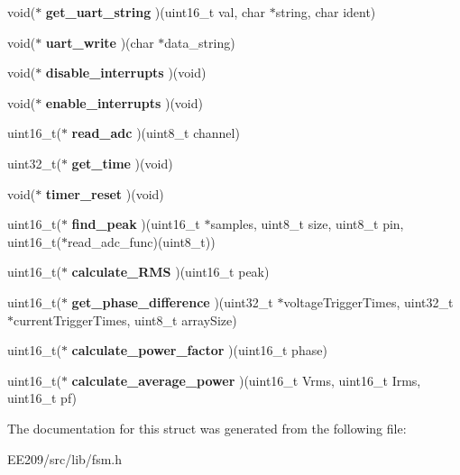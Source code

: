 \begin{DoxyCompactItemize}
void($\ast$ {\bfseries get\+\_\+uart\+\_\+string} )(uint16\+\_\+t val, char $\ast$string, char ident)
\item 
\mbox{\label{structfunctionPointers_aea87a41b93da211db78258d03c4a9333}} 
void($\ast$ {\bfseries uart\+\_\+write} )(char $\ast$data\+\_\+string)
\item 
\mbox{\label{structfunctionPointers_a873d8ee1c634c5eb394a2c218dd1a06f}} 
void($\ast$ {\bfseries disable\+\_\+interrupts} )(void)
\item 
\mbox{\label{structfunctionPointers_a0499f9debfd8ef4b18b5ad26d44000cd}} 
void($\ast$ {\bfseries enable\+\_\+interrupts} )(void)
\item 
\mbox{\label{structfunctionPointers_af258a8ca9519779533318d35a4c286a6}} 
uint16\+\_\+t($\ast$ {\bfseries read\+\_\+adc} )(uint8\+\_\+t channel)
\item 
\mbox{\label{structfunctionPointers_a1a0e169eb639da35ed3d7a107400c923}} 
uint32\+\_\+t($\ast$ {\bfseries get\+\_\+time} )(void)
\item 
\mbox{\label{structfunctionPointers_a75ef23fb4cb26814666aa81243d87b90}} 
void($\ast$ {\bfseries timer\+\_\+reset} )(void)
\item 
\mbox{\label{structfunctionPointers_afa1a0cf772683f68808599dafa407f84}} 
uint16\+\_\+t($\ast$ {\bfseries find\+\_\+peak} )(uint16\+\_\+t $\ast$samples, uint8\+\_\+t size, uint8\+\_\+t pin, uint16\+\_\+t($\ast$read\+\_\+adc\+\_\+func)(uint8\+\_\+t))
\item 
\mbox{\label{structfunctionPointers_ac31f324c049eab23e54529d05712fd1f}} 
uint16\+\_\+t($\ast$ {\bfseries calculate\+\_\+\+R\+MS} )(uint16\+\_\+t peak)
\item 
\mbox{\label{structfunctionPointers_a122ca001985dbd91c3a5fa74f412254a}} 
uint16\+\_\+t($\ast$ {\bfseries get\+\_\+phase\+\_\+difference} )(uint32\+\_\+t $\ast$voltage\+Trigger\+Times, uint32\+\_\+t $\ast$current\+Trigger\+Times, uint8\+\_\+t array\+Size)
\item 
\mbox{\label{structfunctionPointers_a69875834367992d4f9ba37b6a6d43d90}} 
uint16\+\_\+t($\ast$ {\bfseries calculate\+\_\+power\+\_\+factor} )(uint16\+\_\+t phase)
\item 
\mbox{\label{structfunctionPointers_a6c1dcb299823f1c89d5d0f9feea4f0b1}} 
uint16\+\_\+t($\ast$ {\bfseries calculate\+\_\+average\+\_\+power} )(uint16\+\_\+t Vrms, uint16\+\_\+t Irms, uint16\+\_\+t pf)
\end{DoxyCompactItemize}


The documentation for this struct was generated from the following file\+:\begin{DoxyCompactItemize}
\item 
E\+E209/src/lib/fsm.\+h\end{DoxyCompactItemize}

